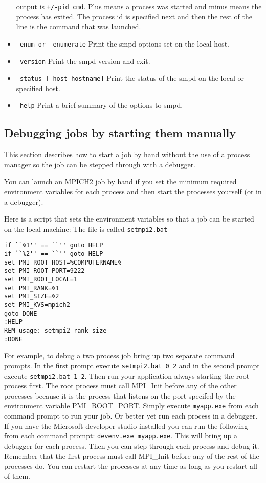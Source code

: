 \documentclass[dvipdfm,11pt]{article}
\begin{document}
\begin{itemize}
output is \texttt{+/-pid cmd}.  Plus means a process was started and minus means
the process has exited.  The process id is specified next and then the rest of the line
is the command that was launched.
\item \texttt{-enum or -enumerate}
Print the smpd options set on the local host.
\item \texttt{-version}
Print the smpd version and exit.
\item \texttt{-status [-host hostname]}
Print the status of the smpd on the local or specified host.
\item \texttt{-help}
Print a brief summary of the options to smpd.
\end{itemize}

\subsection{Debugging jobs by starting them manually}
This section describes how to start a job by hand without the use of a process
manager so the job can be stepped through with a debugger.

You can launch an MPICH2 job by hand if you set the minimum required environment
variables for each process and then start the processes yourself (or in a debugger).

Here is a script that sets the environment variables so that a job can be started
 on the local machine:
The file is called \texttt{setmpi2.bat}
\begin{verbatim}
if ``%1'' == ``'' goto HELP
if ``%2'' == ``'' goto HELP
set PMI_ROOT_HOST=%COMPUTERNAME%
set PMI_ROOT_PORT=9222
set PMI_ROOT_LOCAL=1
set PMI_RANK=%1
set PMI_SIZE=%2
set PMI_KVS=mpich2
goto DONE
:HELP
REM usage: setmpi2 rank size
:DONE
\end{verbatim}

For example, to debug a two process job bring up two separate command prompts.
In the first prompt execute \texttt{setmpi2.bat 0 2} and in the second prompt
execute \texttt{setmpi2.bat 1 2}.  Then run your application always starting
the root process first.  The root process must call MPI\_Init before any of the
other processes because it is the process that listens on the port specifed by
the environment variable PMI\_ROOT\_PORT.  Simply execute \texttt{myapp.exe} from
each command prompt to run your job.  Or better yet run each process in a debugger.
If you have the Microsoft developer studio installed you can run the following
from each command prompt: \texttt{devenv.exe myapp.exe}.  This will bring up a
debugger for each process.  Then you can step through each process and debug it.
Remember that the first process must call MPI\_Init before any of the rest of the
processes do.  You can restart the processes at any time as long as you restart
all of them.
\end{document}
